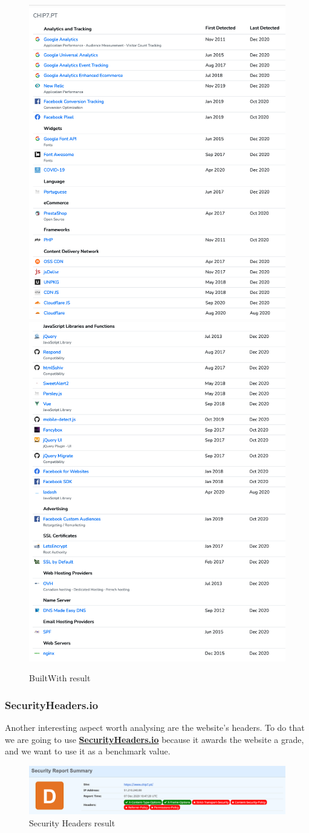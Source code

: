 \begin{figure}[ht!]
 	\centering
 	\includegraphics[width=.5\linewidth]{img/builtwith1.png}
 	\includegraphics[width=.47\linewidth]{img/builtwith2.png}
 	\caption{BuiltWith result}
\end{figure}



\subsubsection{SecurityHeaders.io}

Another interesting aspect worth analysing are the website's headers. To do that we are going to use \textbf{ \href{https://securityheaders.com/?q=chip7.pt&followRedirects=on}{SecurityHeaders.io}} because it awards the website a grade, and we want to use it as a benchmark value.

\begin{figure}[ht!]
 	\centering
 	\includegraphics[width=1\linewidth]{img/securityheaders1.png}
 	\caption{Security Headers result}
\end{figure}

